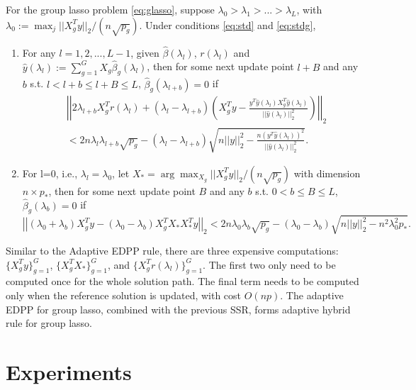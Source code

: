 \begin{theorem}
  For the group lasso problem \eqref{eq:glasso}, suppose $\lambda_0>\lambda_1>...>\lambda_L$, with $\lambda_0:= \max_j ||X_g^Ty||_2 / (n\sqrt{p_g})$. Under conditions \eqref{eq:std} and \eqref{eq:stdg},
    \begin{enumerate}
        \item For any $l=1,2,...,L-1$, given $\hat{\beta}(\lambda_l)$, $r(\lambda_l)$ and $\hat{y}(\lambda_l):=\sum_{g=1}^GX_g\hat{\beta}_g(\lambda_l)$, then for some next update point $l+B$ and any $b$ s.t. $l<l+b\leq l+B\leq L$, $\hat{\beta}_g(\lambda_{l+b})=0$ if
        \begin{equation}
            \begin{split}
                &\left|\left|2\lambda_{l+b}X_g^Tr(\lambda_l)+(\lambda_l-\lambda_{l+b})\left( X_g^Ty-\frac{y^T\hat{y}(\lambda_l)X_g^T\hat{y}(\lambda_l)}{||\hat{y}(\lambda_l)||_2^2}\right)\right|\right|_2\\
                &<2n\lambda_l\lambda_{l+b}\sqrt{p_g}-(\lambda_l-\lambda_{l+b})\sqrt{n||y||_2^2-\frac{n(y^T\hat{y}(\lambda_l))^2}{||\hat{y}(\lambda_l)||_2^2}}.
            \end{split}
        \end{equation}
        \item For l=0, i.e., $\lambda_l=\lambda_0$, let $X_*=\arg \max_{X_g} ||X_g^Ty||_2 / (n\sqrt{p_g})$ with dimension $n\times p_*$, then for some next update point $B$ and any $b$ s.t. $0<b\leq B\leq L$, $\hat{\beta}_g(\lambda_{b})=0$ if
        \begin{equation}
        \left|\left|(\lambda_0+\lambda_b)X_g^Ty-(\lambda_0-\lambda_b)X_g^TX_*X_*^Ty\right|\right|_2<2n\lambda_0\lambda_b\sqrt{p_g}-(\lambda_0-\lambda_b)\sqrt{n||y||_2^2-n^2\lambda_0^2p_*}.
    \end{equation}
    \end{enumerate}
\end{theorem}

Similar to the Adaptive EDPP rule, there are three expensive computations: $\{X_g^Ty\}_{g=1}^G$, $\{X_g^TX_*\}_{g=1}^G$, and $\{X_g^Tr(\lambda_l)\}_{g=1}^G$. The first two only need to be computed once for the whole solution path. The final term needs to be computed only when the reference solution is updated, with cost $O(np)$. The adaptive EDPP for group lasso, combined with the previous SSR, forms adaptive hybrid rule for group lasso.

\section{Experiments}
\label{sec:experiments}

